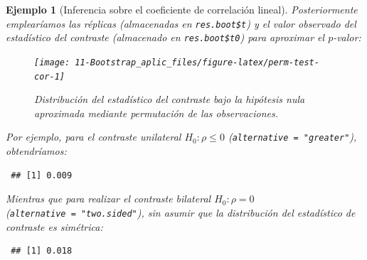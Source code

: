 \documentclass[
]{book}
\newenvironment{Shaded}{\begin{snugshade}}{\end{snugshade}}
\newcommand{\AttributeTok}[1]{\textcolor[rgb]{0.77,0.63,0.00}{#1}}
\newcommand{\ConstantTok}[1]{\textcolor[rgb]{0.00,0.00,0.00}{#1}}
\newcommand{\DecValTok}[1]{\textcolor[rgb]{0.00,0.00,0.81}{#1}}
\newcommand{\FunctionTok}[1]{\textcolor[rgb]{0.00,0.00,0.00}{#1}}
\newcommand{\NormalTok}[1]{#1}
\newcommand{\OtherTok}[1]{\textcolor[rgb]{0.56,0.35,0.01}{#1}}
\newcommand{\SpecialCharTok}[1]{\textcolor[rgb]{0.00,0.00,0.00}{#1}}
\newcommand{\StringTok}[1]{\textcolor[rgb]{0.31,0.60,0.02}{#1}}
\theoremstyle{break}
\newtheorem{example}{Ejemplo}[chapter]
\theoremstyle{nonumberplain}
\begin{document}
\begin{example}[Inferencia sobre el coeficiente de correlación lineal]
Posteriormente emplearíamos las réplicas (almacenadas en \texttt{res.boot\$t}) y el valor
observado del estadístico del contraste (almacenado en \texttt{res.boot\$t0})
para aproximar el \(p\)-valor:

\begin{Shaded}
\end{Shaded}

\begin{figure}[!htb]

{\centering \texttt{[image: 11-Bootstrap\_aplic\_files/figure-latex/perm-test-cor-1]} 

}

\caption{Distribución del estadístico del contraste bajo la hipótesis nula aproximada mediante permutación de las observaciones.}\label{fig:perm-test-cor}
\end{figure}

Por ejemplo, para el contraste unilateral \(H_0: \rho \leq 0\)
(\texttt{alternative\ =\ "greater"}), obtendríamos:

\begin{Shaded}
\end{Shaded}

\begin{verbatim}
 ## [1] 0.009
\end{verbatim}

Mientras que para realizar el contraste bilateral \(H_0: \rho = 0\)
(\texttt{alternative\ =\ "two.sided"}), sin asumir que
la distribución del estadístico de contraste es simétrica:

\begin{Shaded}
\end{Shaded}

\begin{verbatim}
 ## [1] 0.018
\end{verbatim}

\end{example}
\end{document}
